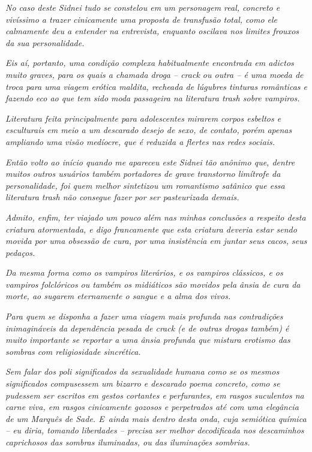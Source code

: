 \emph{No caso deste Sidnei tudo se constelou em um personagem real,
concreto e vivíssimo a trazer cinicamente uma proposta de transfusão
total, como ele calmamente deu a entender na entrevista, enquanto
oscilava nos limites frouxos da sua personalidade.}~

\emph{Eis aí, portanto, uma condição complexa habitualmente encontrada
em adictos muito graves, para os quais a chamada droga -- crack ou outra
-- é uma moeda de troca para uma viagem erótica maldita, recheada de
lúgubres tinturas românticas e fazendo eco ao que tem sido moda
passageira na literatura trash sobre vampiros.}~

\emph{Literatura feita principalmente para adolescentes mirarem corpos
esbeltos e esculturais em meio a um descarado desejo de sexo, de
contato, porém apenas ampliando uma visão medíocre, que é reduzida a
flertes nas redes sociais.}~

\emph{Então volto ao início quando me apareceu este Sidnei tão anônimo
que, dentre muitos outros usuários também portadores de grave transtorno
limítrofe da personalidade, foi quem melhor sintetizou um romantismo
satânico que essa literatura trash não consegue fazer por ser
pasteurizada demais.}~

\emph{Admito, enfim, ter viajado um pouco além nas minhas conclusões a
respeito desta criatura atormentada, e digo francamente que esta
criatura deveria estar sendo movida por uma obsessão de cura, por uma
insistência em juntar seus cacos, seus pedaços.}~

\emph{Da mesma forma como os vampiros literários, e os vampiros
clássicos, e os vampiros folclóricos ou também os midiáticos são movidos
pela ânsia de cura da morte, ao sugarem eternamente o sangue e a alma
dos vivos.}~

\emph{Para quem se disponha a fazer uma viagem mais profunda nas
contradições inimagináveis da dependência pesada de crack (e de outras
drogas também) é muito importante se reportar a uma ânsia profunda que
mistura erotismo das sombras com religiosidade sincrética.}~

\emph{Sem falar dos poli significados da sexualidade humana como se os
mesmos significados compusessem um bizarro e descarado poema concreto,
como se pudessem ser escritos em gestos cortantes e perfurantes, em
rasgos suculentos na carne viva, em rasgos cinicamente gozosos e
perpetrados até com uma elegância de um Marquês de Sade. E~ainda mais
dentro desta onda, cuja semiótica química -- eu diria, tomando
liberdades -- precisa ser melhor decodificada nos descaminhos
caprichosos das sombras iluminadas, ou das iluminações sombrias.}~


